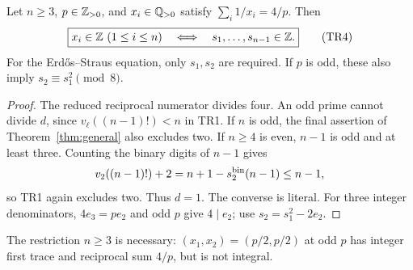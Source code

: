 \begin{corollary}\label{cor:four}
Let $n\ge3$, $p\in\mathbb Z_{>0}$, and $x_i\in\mathbb Q_{>0}$ satisfy
$\sum_i1/x_i=4/p$. Then
\[
 \boxed{x_i\in\mathbb Z\ (1\le i\le n)
 \quad\Longleftrightarrow\quad s_1,\ldots,s_{n-1}\in\mathbb Z.} \tag{TR4}
\]
For the Erd\H{o}s--Straus equation, only $s_1,s_2$ are required. If $p$ is odd,
these also imply $s_2\equiv s_1^2\pmod8$.
\end{corollary}
\begin{proof}
The reduced reciprocal numerator divides four. An odd prime cannot divide $d$,
since $v_\ell((n-1)!)<n$ in TR1. If $n$ is odd, the final assertion of
Theorem~\ref{thm:general} also excludes two. If $n\ge4$ is even, $n-1$ is odd
and at least three. Counting the binary digits of $n-1$ gives
\[
 v_2((n-1)!)+2=n+1-s_2^{\rm bin}(n-1)\le n-1,
\]
so TR1 again excludes two. Thus $d=1$. The converse is literal. For three
integer denominators, $4e_3=pe_2$ and odd $p$ give $4\mid e_2$; use
$s_2=s_1^2-2e_2$.
\end{proof}
The restriction $n\ge3$ is necessary: $(x_1,x_2)=(p/2,p/2)$ at odd $p$ has
integer first trace and reciprocal sum $4/p$, but is not integral.

